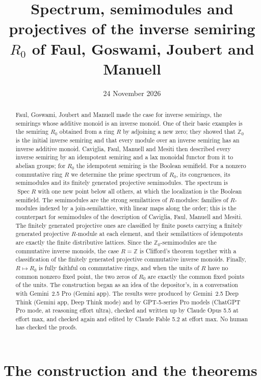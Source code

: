 \documentclass[11pt]{amsart}
\title[Spectrum, semimodules and projectives of $R_0$]{Spectrum, semimodules and projectives of the inverse semiring $R_0$ of Faul, Goswami, Joubert and Manuell}
\author{}
\date{24 November 2026}
\theoremstyle{remark}
\DeclareMathOperator{\Spec}{Spec}
\begin{document}
\begin{abstract}
Faul, Goswami, Joubert and Manuell made the case for inverse semirings, the semirings whose additive monoid is an inverse monoid. One of their basic examples is the semiring $R_0$ obtained from a ring $R$ by adjoining a new zero; they showed that $\mathbb Z_0$ is the initial inverse semiring and that every module over an inverse semiring has an inverse additive monoid. Caviglia, Faul, Manuell and Mesiti then described every inverse semiring by an idempotent semiring and a lax monoidal functor from it to abelian groups; for $R_0$ the idempotent semiring is the Boolean semifield. For a nonzero commutative ring $R$ we determine the prime spectrum of $R_0$, its congruences, its semimodules and its finitely generated projective semimodules. The spectrum is $\Spec R$ with one new point below all others, at which the localization is the Boolean semifield. The semimodules are the strong semilattices of $R$-modules: families of $R$-modules indexed by a join-semilattice, with linear maps along the order; this is the counterpart for semimodules of the description of Caviglia, Faul, Manuell and Mesiti. The finitely generated projective ones are classified by finite posets carrying a finitely generated projective $R$-module at each element, and their semilattices of idempotents are exactly the finite distributive lattices. Since the $\mathbb Z_0$-semimodules are the commutative inverse monoids, the case $R=\mathbb Z$ is Clifford's theorem together with a classification of the finitely generated projective commutative inverse monoids. Finally, $R\mapsto R_0$ is fully faithful on commutative rings, and when the units of $R$ have no common nonzero fixed point, the two zeros of $R_0$ are exactly the common fixed points of the units. The construction began as an idea of the depositor's, in a conversation with Gemini~2.5 Pro (Gemini app). The results were produced by Gemini~2.5 Deep Think (Gemini app, Deep Think mode) and by GPT-5-series Pro models (ChatGPT Pro mode, at reasoning effort ultra), checked and written up by Claude Opus 5.5 at effort max, and checked again and edited by Claude Fable 5.2 at effort max. No human has checked the proofs.
\end{abstract}

\maketitle

\section{The construction and the theorems}
\end{document}

